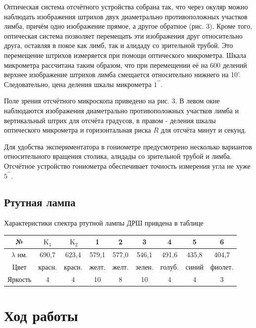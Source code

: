 \documentclass[a4paper,12pt]{article} %
\begin{document}
Оптическая система отсчётного устройства собрана так, что через окуляр можно наблюдать изображения штрихов двух диаметрально противоположных участков лимба, причём одно изображение прямое, а другое обратное (рис. 3). Кроме того, оптическая система позволяет перемещать эти изображения друг относительно друга, оставляя в покое как лимб, так и алидаду со зрительной трубой. Это перемещение штрихов измеряется при помощи оптического микрометра. Шкала микрометра рассчитана таким образом, что при перемещении её на 600 делений верхнее изображение штрихов лимба смещается относительно нижнего на 10'. Следовательно, цена деления шкалы микрометра $1^{\prime \prime}$.

Поле зрения отсчётного микроскопа приведено на рис. 3. В левом окне наблюдаются изображения диаметрально противоположных участков лимба и вертикальный штрих для отсчёта градусов, в правом - деления шкалы оптического микрометра и горизонтальная риска $R$ для отсчёта минут и секунд.

Для удобства экспериментатора в гониометре предусмотрено несколько вариантов относительного вращения столика, алидады со зрительной трубой и лимба.
Отсчётное устройство гониометра обеспечивает точность измерения угла не хуже $5^{\prime \prime}$.

\subsection{Ртутная лампа}

Характеристики спектра ртутной лампы ДРШ привдена в таблице

\begin{center}
\begin{tabular}{|c|c|c|c|c|c|c|c|c|}
\hline
№ & $\mathrm{K}_{1}$ & $\mathrm{~K}_{2}$ & 1 & 2 & 3 & 4 & 5 & 6 \\
\hline
$\lambda$ нм. & 690,7 & 623,4 & 579,1 & 577,0 & 546,1 & 491,6 & 435,8 & 404,7 \\
\hline
Цвет & красн. & красн. & желт. & желт. & зелен. & голуб. & синий & фиолет. \\
\hline
Яркость & 4 & 4 & 10 & 8 & 10 & 4 & 4 & 3 \\
\hline
\end{tabular}
\end{center}

\section{Ход работы}
\end{document}
